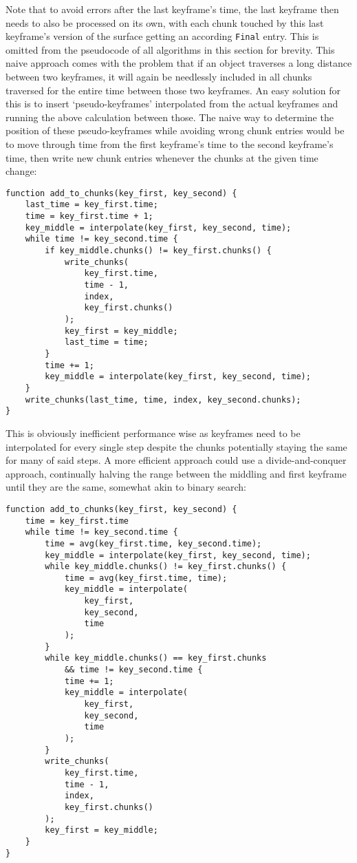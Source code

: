 Note that to avoid errors after the last keyframe's time,
the last keyframe then needs to also be processed on its own,
with each chunk touched by this last keyframe's version of the surface getting an according \verb|Final| entry.
This is omitted from the pseudocode of all algorithms in this section for brevity.
\newline
This naive approach comes with the problem that if an object traverses a long distance between two keyframes,
it will again be needlessly included in all chunks traversed for the entire time between those two keyframes.
An easy solution for this is to insert `pseudo-keyframes' interpolated from the actual keyframes
and running the above calculation between those.
\newline
The naive way to determine the position of these pseudo-keyframes while avoiding wrong chunk entries
would be to move through time from the first keyframe's time to the second keyframe's time,
then write new chunk entries whenever the chunks at the given time change:

\begin{verbatim}
function add_to_chunks(key_first, key_second) {
    last_time = key_first.time;
    time = key_first.time + 1;
    key_middle = interpolate(key_first, key_second, time);
    while time != key_second.time {
        if key_middle.chunks() != key_first.chunks() {
            write_chunks(
                key_first.time,
                time - 1,
                index,
                key_first.chunks()
            );
            key_first = key_middle;
            last_time = time;
        }
        time += 1;
        key_middle = interpolate(key_first, key_second, time);
    }
    write_chunks(last_time, time, index, key_second.chunks);
}
\end{verbatim}

This is obviously inefficient performance wise as keyframes need to be interpolated for every single step
despite the chunks potentially staying the same for many of said steps.
A more efficient approach could use a divide-and-conquer approach,
continually halving the range between the middling and first keyframe until they are the same,
somewhat akin to binary search:

\begin{verbatim}
function add_to_chunks(key_first, key_second) {
    time = key_first.time
    while time != key_second.time {
        time = avg(key_first.time, key_second.time);
        key_middle = interpolate(key_first, key_second, time);
        while key_middle.chunks() != key_first.chunks() {
            time = avg(key_first.time, time);
            key_middle = interpolate(
                key_first,
                key_second,
                time
            );
        }
        while key_middle.chunks() == key_first.chunks
            && time != key_second.time {
            time += 1;
            key_middle = interpolate(
                key_first,
                key_second,
                time
            );
        }
        write_chunks(
            key_first.time, 
            time - 1, 
            index,
            key_first.chunks()
        );
        key_first = key_middle;
    }
}
\end{verbatim}

